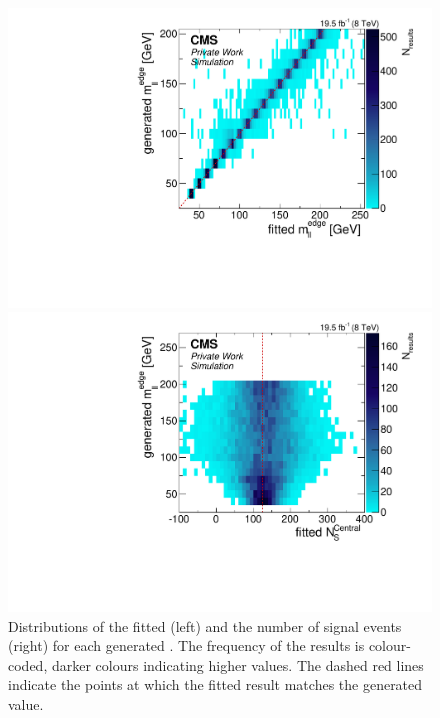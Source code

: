 \begin{figure}[hbp]
  \centering
  \begin{minipage}[t]{0.49\textwidth}
    \includegraphics[width=\textwidth]{plots/results/fit/toyResults/generatedM0vsfittedM0_signalInjectedN125.pdf}
  \end{minipage}
  \begin{minipage}[t]{0.49\textwidth}
    \includegraphics[width=\textwidth]{plots/results/fit/toyResults/generatedM0vsfittedNS_signalInjectedN125.pdf}
  \end{minipage}
  \caption{Distributions of the fitted \mlledge (left) and the number of signal events (right) for each generated \mlledge. The frequency of the results is colour-coded, darker colours indicating higher values. The dashed red lines indicate the points at which the fitted result matches the generated value.}
    \label{fig:toys:scan}
\end{figure}

